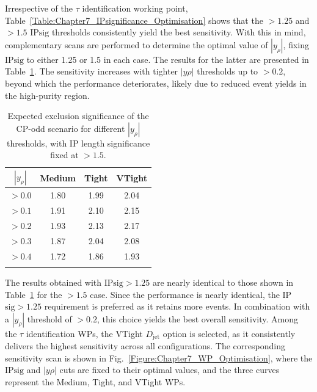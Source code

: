 Irrespective of the $\tau$ identification working point, Table~\ref{Table:Chapter7_IPsignificance_Optimisation} shows that the $>1.25$ and $>1.5$ IP$\text{sig}$ thresholds consistently yield the best sensitivity. With this in mind, complementary scans are performed to determine the optimal value of $|y_\rho|$, fixing IP$\text{sig}$ to either 1.25 or 1.5 in each case. The results for the latter are presented in Table~\ref{Table:Chapter7_yrho_Optimisation}. The sensitivity increases with tighter $|y\rho|$ thresholds up to $>0.2$, beyond which the performance deteriorates, likely due to reduced event yields in the high-purity region.

\begin{table}[!htbp]
\centering
\renewcommand{\arraystretch}{1.5} %
\setlength{\tabcolsep}{10pt} %
\begin{tabular}{c c c c}
\hline
$|y_\rho|$ & Medium & Tight & VTight \\
\hline
$>0.0$ & 1.80 & 1.99 & 2.04 \\
\arrayrulecolor{lightgray} \hline
$>0.1$           & 1.91 & 2.10 & 2.15 \\
\arrayrulecolor{lightgray} \hline

$>0.2$           & 1.93 & 2.13 & 2.17 \\
\arrayrulecolor{lightgray} \hline

$>0.3$           & 1.87 & 2.04 & 2.08 \\
\arrayrulecolor{lightgray} \hline

$>0.4$           & 1.72 & 1.86 & 1.93 \\
\arrayrulecolor{black} \hline
\end{tabular}
\caption{Expected exclusion significance of the CP-odd scenario for different $|y_\rho|$ thresholds, with IP length significance fixed at $>1.5$.}
\label{Table:Chapter7_yrho_Optimisation}
\end{table}

The results obtained with IP$\text{sig}>1.25$ are nearly identical to those shown in Table~\ref{Table:Chapter7_yrho_Optimisation} for the $>1.5$ case. Since the performance is nearly identical, the IP$\text{sig}>1.25$ requirement is preferred as it retains more events. In combination with a $|y_\rho|$ threshold of $>0.2$, this choice yields the best overall sensitivity. Among the $\tau$ identification \acp{WP}, the VTight $D_{\text{jet}}$ option is selected, as it consistently delivers the highest sensitivity across all configurations. The corresponding sensitivity scan is shown in Fig.~\ref{Figure:Chapter7_WP_Optimisation}, where the IP$\text{sig}$ and $|y\rho|$ cuts are fixed to their optimal values, and the three curves represent the Medium, Tight, and VTight \acp{WP}.

